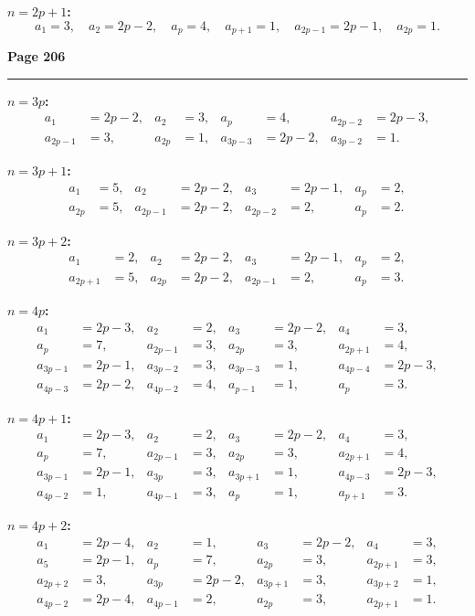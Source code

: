 \documentclass[12pt,a4paper]{article}
\theoremstyle{plain}
\theoremstyle{definition}
\theoremstyle{remark}
\begin{document}
\noindent\textbf{$n = 2p + 1$:}
\[
a_1 = 3, \quad a_2 = 2p - 2, \quad a_p = 4, \quad a_{p+1} = 1, \quad a_{2p-1} = 2p - 1, \quad a_{2p} = 1.
\]

\newpage
\noindent\textbf{Page 206}\\
\noindent\rule{\textwidth}{0.4pt}

\smallskip

\noindent\textbf{$n = 3p$:}
\begin{align*}
a_1 &= 2p - 2, & a_2 &= 3, & a_p &= 4, & a_{2p-2} &= 2p - 3, \\
a_{2p-1} &= 3, & a_{2p} &= 1, & a_{3p-3} &= 2p - 2, & a_{3p-2} &= 1.
\end{align*}

\noindent\textbf{$n = 3p + 1$:}
\begin{align*}
a_1 &= 5, & a_2 &= 2p - 2, & a_3 &= 2p - 1, & a_p &= 2, \\
a_{2p} &= 5, & a_{2p-1} &= 2p - 2, & a_{2p-2} &= 2, & a_p &= 2.
\end{align*}

\noindent\textbf{$n = 3p + 2$:}
\begin{align*}
a_1 &= 2, & a_2 &= 2p - 2, & a_3 &= 2p - 1, & a_p &= 2, \\
a_{2p+1} &= 5, & a_{2p} &= 2p - 2, & a_{2p-1} &= 2, & a_p &= 3.
\end{align*}

\noindent\textbf{$n = 4p$:}
\begin{align*}
a_1 &= 2p - 3, & a_2 &= 2, & a_3 &= 2p - 2, & a_4 &= 3, \\
a_p &= 7, & a_{2p-1} &= 3, & a_{2p} &= 3, & a_{2p+1} &= 4, \\
a_{3p-1} &= 2p - 1, & a_{3p-2} &= 3, & a_{3p-3} &= 1, & a_{4p-4} &= 2p - 3, \\
a_{4p-3} &= 2p - 2, & a_{4p-2} &= 4, & a_{p-1} &= 1, & a_p &= 3.
\end{align*}

\noindent\textbf{$n = 4p + 1$:}
\begin{align*}
a_1 &= 2p - 3, & a_2 &= 2, & a_3 &= 2p - 2, & a_4 &= 3, \\
a_p &= 7, & a_{2p-1} &= 3, & a_{2p} &= 3, & a_{2p+1} &= 4, \\
a_{3p-1} &= 2p - 1, & a_{3p} &= 3, & a_{3p+1} &= 1, & a_{4p-3} &= 2p - 3, \\
a_{4p-2} &= 1, & a_{4p-1} &= 3, & a_p &= 1, & a_{p+1} &= 3.
\end{align*}

\noindent\textbf{$n = 4p + 2$:}
\begin{align*}
a_1 &= 2p - 4, & a_2 &= 1, & a_3 &= 2p - 2, & a_4 &= 3, \\
a_5 &= 2p - 1, & a_p &= 7, & a_{2p} &= 3, & a_{2p+1} &= 3, \\
a_{2p+2} &= 3, & a_{3p} &= 2p - 2, & a_{3p+1} &= 3, & a_{3p+2} &= 1, \\
a_{4p-2} &= 2p - 4, & a_{4p-1} &= 2, & a_{2p} &= 3, & a_{2p+1} &= 1.
\end{align*}
\end{document}
